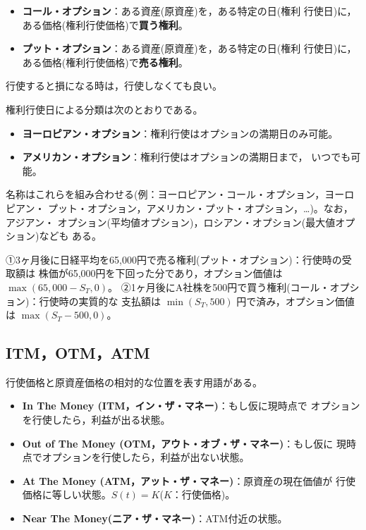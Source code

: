 \begin{definition}
\begin{itemize}
\item \textbf{コール・オプション}：ある資産(原資産)を，ある特定の日(権利
行使日)に，ある価格(権利行使価格)で\textbf{買う権利}。
\item \textbf{プット・オプション}：ある資産(原資産)を，ある特定の日(権利
行使日)に，ある価格(権利行使価格)で\textbf{売る権利}。
\end{itemize}
行使すると損になる時は，行使しなくても良い。
\end{definition}

権利行使日による分類は次のとおりである。
\begin{itemize}
\item \textbf{ヨーロピアン・オプション}：権利行使はオプションの満期日のみ可能。
\item \textbf{アメリカン・オプション}：権利行使はオプションの満期日まで，
いつでも可能。
\end{itemize}
名称はこれらを組み合わせる(例：ヨーロピアン・コール・オプション，ヨーロピアン・
プット・オプション，アメリカン・プット・オプション，…)。なお，アジアン・
オプション(平均値オプション)，ロシアン・オプション(最大値オプション)なども
ある。

\begin{example}[行使時の価値]
①3ヶ月後に日経平均を65,000円で売る権利(プット・オプション)：行使時の受取額は
株価が65,000円を下回った分であり，オプション価値は $\max(65{,}000-S_T, 0)$。
②1ヶ月後にA社株を500円で買う権利(コール・オプション)：行使時の実質的な
支払額は $\min(S_T, 500)$ 円で済み，オプション価値は $\max(S_T-500, 0)$。
\end{example}

\vspace{18pt}

\subsection{ITM，OTM，ATM}

行使価格と原資産価格の相対的な位置を表す用語がある。

\begin{itemize}
\item \textbf{In The Money (ITM，イン・ザ・マネー)}：もし仮に現時点で
オプションを行使したら，利益が出る状態。
\item \textbf{Out of The Money (OTM，アウト・オブ・ザ・マネー)}：もし仮に
現時点でオプションを行使したら，利益が出ない状態。
\item \textbf{At The Money (ATM，アット・ザ・マネー)}：原資産の現在価値が
行使価格に等しい状態。$S(t) = K$($K$：行使価格)。
\item \textbf{Near The Money(ニア・ザ・マネー)}：ATM付近の状態。
\end{itemize}


